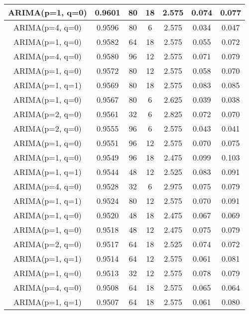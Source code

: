 \begin{table*}[h!]
\begin{tabular}{|c|c|c|c|c|c|c|}
        \hline
        ARIMA(p=1, q=0) & 0.9601 & 80 & 18 & 2.575 &  0.074 & 0.077 \\
        \hline
        ARIMA(p=4, q=0) & 0.9596 & 80 & 6 & 2.575 &  0.034 & 0.047 \\
        \hline
        ARIMA(p=1, q=0) & 0.9582 & 64 & 18 & 2.575 &  0.055 & 0.072 \\
        \hline
        ARIMA(p=4, q=0) & 0.9580 & 96 & 12 & 2.575 &  0.071 & 0.079 \\
        \hline
        ARIMA(p=1, q=0) & 0.9572 & 80 & 12 & 2.575 &  0.058 & 0.070 \\
        \hline
        ARIMA(p=1, q=1) & 0.9569 & 80 & 18 & 2.575 &  0.083 & 0.085 \\
        \hline
        ARIMA(p=1, q=0) & 0.9567 & 80 & 6 & 2.625 &  0.039 & 0.038 \\
        \hline
        ARIMA(p=2, q=0) & 0.9561 & 32 & 6 & 2.825 &  0.072 & 0.070 \\
        \hline
        ARIMA(p=2, q=0) & 0.9555 & 96 & 6 & 2.575 &  0.043 & 0.041 \\
        \hline
        ARIMA(p=1, q=0) & 0.9551 & 96 & 12 & 2.575 &  0.070 & 0.075 \\
        \hline
        ARIMA(p=1, q=0) & 0.9549 & 96 & 18 & 2.475 &  0.099 & 0.103 \\
        \hline
        ARIMA(p=1, q=1) & 0.9544 & 48 & 12 & 2.525 &  0.083 & 0.091 \\
        \hline
        ARIMA(p=4, q=0) & 0.9528 & 32 & 6 & 2.975 &  0.075 & 0.079 \\
        \hline
        ARIMA(p=1, q=1) & 0.9524 & 80 & 12 & 2.575 &  0.070 & 0.091 \\
        \hline
        ARIMA(p=1, q=0) & 0.9520 & 48 & 18 & 2.475 &  0.067 & 0.069 \\
        \hline
        ARIMA(p=1, q=0) & 0.9518 & 48 & 12 & 2.475 &  0.075 & 0.079 \\
        \hline
        ARIMA(p=2, q=0) & 0.9517 & 64 & 18 & 2.525 &  0.074 & 0.072 \\
        \hline
        ARIMA(p=1, q=1) & 0.9514 & 64 & 12 & 2.575 &  0.061 & 0.081 \\
        \hline
        ARIMA(p=1, q=0) & 0.9513 & 32 & 12 & 2.575 &  0.078 & 0.079 \\
        \hline
        ARIMA(p=4, q=0) & 0.9508 & 64 & 18 & 2.575 &  0.065 & 0.064 \\
        \hline
        ARIMA(p=1, q=1) & 0.9507 & 64 & 18 & 2.575 &  0.061 & 0.080 \\

\end{tabular}
\end{table*}
